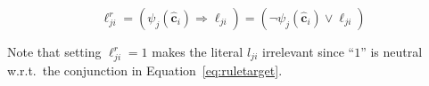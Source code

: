 \begin{equation}~\label{eq:filter}
    \ell^r_{ji} = (\psi_j(\hat{\mathbf{c}}_i)\Rightarrow \ell_{ji})= (\neg \psi_j(\hat{\mathbf{c}}_i) \vee \ell_{ji})
\end{equation}

Note that setting $\ell^r_{ji}=1$ makes the literal $l_{ji}$ irrelevant since ``$1$'' is neutral w.r.t.\ the conjunction in Equation~\ref{eq:ruletarget}. 


